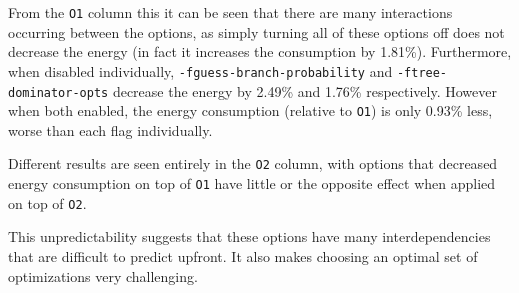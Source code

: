 \documentclass[twocolumn]{article}
\begin{document}
From the \texttt{O1} column this it can be seen that there are many interactions occurring between the options, as simply turning all of these options off does not decrease the energy (in fact it increases the consumption by 1.81\%). Furthermore, when disabled individually, \texttt{-fguess-branch-probability} and \texttt{-ftree-dominator-opts} decrease the energy by 2.49\% and 1.76\% respectively. However when both enabled, the energy consumption (relative to \texttt{O1}) is only 0.93\% less, worse than each flag individually.

Different results are seen entirely in the \texttt{O2} column, with options that decreased energy consumption on top of \texttt{O1} have little or the opposite effect when applied on top of \texttt{O2}.

This unpredictability suggests that these options have many interdependencies that are difficult to predict upfront. It also makes choosing an optimal set of optimizations very challenging.
\end{document}
